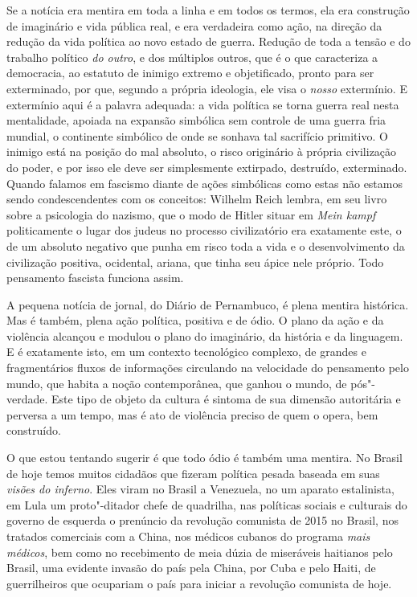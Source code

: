 Se a notícia era mentira em toda a linha e em todos os termos, ela era
construção de imaginário e vida pública real, e era verdadeira como
ação, na direção da redução da vida política ao novo estado de guerra.
Redução de toda a tensão e do trabalho político \emph{do outro}, e dos
múltiplos outros, que é o que caracteriza a democracia, ao estatuto de
inimigo extremo e objetificado, pronto para ser exterminado, por que,
segundo a própria ideologia, ele visa o \emph{nosso} extermínio. E
extermínio aqui é a palavra adequada: a vida política se torna guerra
real nesta mentalidade, apoiada na expansão simbólica sem controle de
uma guerra fria mundial, o continente simbólico de onde se sonhava tal
sacrifício primitivo. O inimigo está na posição do mal absoluto, o risco
originário à própria civilização do poder, e por isso ele deve ser
simplesmente extirpado, destruído, exterminado. Quando falamos em
fascismo diante de ações simbólicas como estas não estamos sendo
condescendentes com os conceitos: Wilhelm Reich lembra, em seu livro
sobre a psicologia do nazismo, que o modo de Hitler situar em \emph{Mein
kampf} politicamente o lugar dos judeus no processo civilizatório era
exatamente este, o de um absoluto negativo que punha em risco toda a
vida e o desenvolvimento da civilização positiva, ocidental, ariana, que
tinha seu ápice nele próprio. Todo pensamento fascista funciona assim.

A pequena notícia de jornal, do Diário de Pernambuco, é plena mentira
histórica. Mas é também, plena ação política, positiva e de ódio. O
plano da ação e da violência alcançou e modulou o plano do imaginário,
da história e da linguagem. E é exatamente isto, em um contexto
tecnológico complexo, de grandes e fragmentários fluxos de informações
circulando na velocidade do pensamento pelo mundo, que habita a noção
contemporânea, que ganhou o mundo, de pós"-verdade. Este tipo de objeto
da cultura é sintoma de sua dimensão autoritária e perversa a um tempo,
mas é ato de violência preciso de quem o opera, bem construído.

O que estou tentando sugerir é que todo ódio é também uma mentira. No
Brasil de hoje temos muitos cidadãos que fizeram política pesada baseada
em suas \emph{visões do inferno}. Eles viram no Brasil a Venezuela, no
 um aparato estalinista, em Lula um proto"-ditador chefe de quadrilha,
nas políticas sociais e culturais do governo de esquerda o prenúncio da
revolução comunista de 2015 no Brasil, nos tratados comerciais com a
China, nos médicos cubanos do programa \emph{mais médicos}, bem como no
recebimento de meia dúzia de miseráveis haitianos pelo Brasil, uma
evidente invasão do país pela China, por Cuba e pelo Haiti, de
guerrilheiros que ocupariam o país para iniciar a revolução comunista de
hoje.

